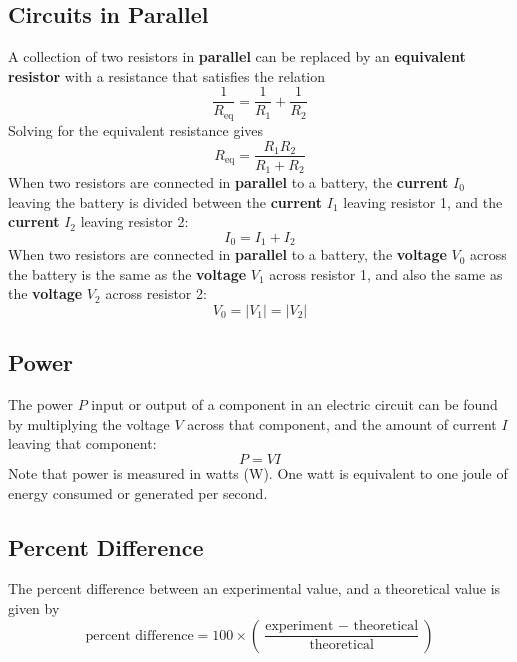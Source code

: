 \subsection{Circuits in Parallel}
A collection of two resistors in \textbf{parallel} can be replaced by an \textbf{equivalent resistor} with a resistance that satisfies the relation
\begin{equation}
	\frac{1}{R_{\text{eq}}} = \frac{1}{R_{1}} + \frac{1}{R_{2}}
\end{equation}
Solving for the equivalent resistance gives
\begin{equation} \label{eq.03.RParallel}
	R_{\text{eq}} = \frac{R_{1} R_{2}}{R_{1} + R_{2}}
\end{equation}
When two resistors are connected in \textbf{parallel} to a battery, the \textbf{current} $I_{0}$ leaving the battery is divided between the \textbf{current} $I_{1}$ leaving resistor 1, and the \textbf{current} $I_{2}$ leaving resistor 2:
\begin{equation} \label{eq.03.IParallel}
	I_{0} = I_{1} + I_{2}
\end{equation}
When two resistors are connected in \textbf{parallel} to a battery, the \textbf{voltage} $V_{0}$ across the battery is the same as the \textbf{voltage} $V_{1}$ across resistor 1, and also the same as the \textbf{voltage} $V_{2}$ across resistor 2:
\begin{equation} \label{eq.03.VParallel}
	V_{0} = \left| V_{1} \right| = \left| V_{2} \right|
\end{equation}
\subsection{Power}
The power $P$ input or output of a component in an electric circuit can be found by multiplying the voltage $V$ across that component, and the amount of current $I$ leaving that component:
\begin{equation}
	P = VI
\end{equation}
Note that power is measured in watts (W). One watt is equivalent to one joule of energy consumed or generated per second.
\subsection{Percent Difference}
The percent difference between an experimental value, and a theoretical value is given by
\begin{equation}
	\text{percent difference} = 100 \times \left( \frac{\text{experiment } - \text{ theoretical}}{\text{theoretical}} \right)
\end{equation}
